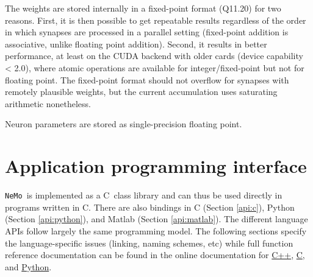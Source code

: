 \documentclass[a4paper]{article}
\newcommand{\nemo}{\texttt{NeMo}}
\newcommand{\cpp}{C\nolinebreak\hspace{-.05em}\raisebox{.4ex}{\tiny\bf +}\nolinebreak\hspace{-.10em}\raisebox{.4ex}{\tiny\bf +}}
\begin{document}
The weights are stored internally in a fixed-point format (Q11.20) for two reasons.
First,
	it is then possible to get repeatable results regardless of the order in which synapses are processed in a parallel setting (fixed-point addition is associative, unlike floating point addition).
Second, 
	it results in better performance,
		at least on the CUDA backend with older cards (device capability < 2.0),
		where atomic operations are available for integer/fixed-point but not for floating point. 
The fixed-point format should not overflow for synapses with remotely plausible weights,
	but the current accumulation uses saturating arithmetic nonetheless.

Neuron parameters are stored as single-precision floating point.






% 

\section{Application programming interface}
\label{api}

\nemo\ is implemented as a \cpp\ class library and can thus be used directly in programs written in \cpp.
There are also bindings in
	C (Section \ref{api:c}),
	Python (Section \ref{api:python}),
	and Matlab (Section \ref{api:matlab}).
The different language APIs follow largely the same programming model.
The following sections specify the language-specific issues
	(linking, naming schemes, etc)
	while full function reference documentation can be found in the online documentation for
	\href{http://nemosim.sourceforge.net/api/index.html}{C++},
	\href{http://nemosim.sourceforge.net/api/nemo_8h.html}{C}, and
	\href{http://nemosim.sourceforge.net/python/nemo.html}{Python}.
\end{document}
